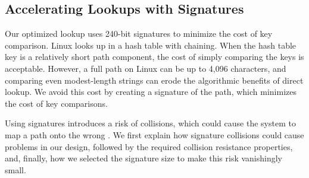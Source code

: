 


\subsection{Accelerating Lookups with Signatures}
\label{sec:dcache:collision}
\label{sec:dcache:signatures}

Our optimized lookup uses 240-bit signatures to minimize the cost of
key comparison.
Linux looks up \dentries{} in a hash table with chaining.
When the hash table key is a relatively short path component, the cost of simply 
comparing the keys is acceptable.  However, a full path on Linux can be up to 4,096 characters,
and comparing even modest-length strings can erode the algorithmic benefits of
direct lookup.
We avoid this cost by creating a signature of the path, which 
minimizes the cost of key comparisons.

Using signatures introduces a risk of collisions, 
which could cause the system to map a path onto the wrong \dentry{}.
We first explain how signature collisions could cause problems in our design,
followed by the required collision resistance properties,
and, finally, how we selected the signature size to make this
risk vanishingly small.



